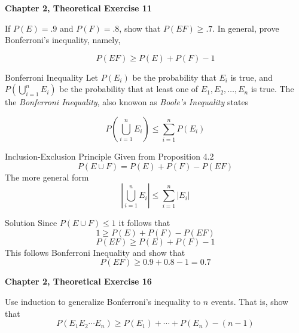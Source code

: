 \documentclass{article}
\begin{document}
\begin{spacing}{1.1}
\maketitle
\newpage
\begin{homeworkProblem}
  {\bf Chapter 2, Theoretical Exercise 11} 

  If $P( E) = .9$ and $P( F) = .8$, show that $P( EF) \ge .7$. In general, prove Bonferroni’s inequality, namely,

  \[P( EF) \ge P( E) + P( F) - 1\]

  \begin{homeworkSection}{Bonferroni Inequality}
    Let $P( E_i)$ be the probability that $E_i$ is true, and $P\left( \bigcup\limits_{i = 1}^{n}{ E_i}\right)$ be the probability 
    that at least one of $E_1, E_2, \dots, E_n$ is true.  The the \emph{Bonferroni Inequality}, also knowon as \emph{Boole's Inequality} states

    \[P\left( \bigcup\limits_{i = 1}^{n}{ E_i}\right) \le \sum\limits_{i = 1}^{n}{ P( E_i)}\]
  \end{homeworkSection}	

  \begin{homeworkSection}{Inclusion-Exclusion Principle}
    Given from Proposition 4.2
      \[P( E \cup F) = P( E) + P( F) - P( EF)\]
    The more general form
      \[\left|\bigcup\limits_{i = 1}^{n}{ E_i}\right| \le \sum\limits_{i = 1}^{n}{ \left|E_i\right|}\]
  \end{homeworkSection}

	\begin{homeworkSection}{Solution}
    Since $P( E \cup F) \le 1$ it follows that 
      \[1 \ge P( E) + P( F) - P( EF)\]
      \[P( EF) \ge P( E) + P( F) - 1\]
    This follows Bonferroni Inequality and show that
      \[P( EF) \ge 0.9 + 0.8 - 1 = 0.7\]
    
	\end{homeworkSection}
\end{homeworkProblem}

\newpage
\begin{homeworkProblem}
  {\bf Chapter 2, Theoretical Exercise 16}
  
  Use induction to generalize Bonferroni’s inequality to $n$ events. That is, show that
    \[P( E_1 E_2 \cdots E_n) \ge P( E_1) + \cdots + P( E_n) - (n - 1)\]


\end{homeworkProblem}
\end{spacing}
\end{document}
